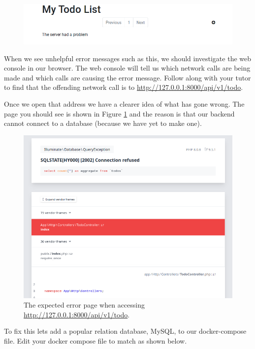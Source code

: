 \documentclass{csse4400}
\begin{document}
\begin{figure}[ht]
\includegraphics[width=\textwidth]{images/app-missing-db}
\end{figure}

When we see unhelpful error messages such as this,
we should investigate the web console in our browser.
The web console will tell us which network calls are being made and which calls are causing the error message.
Follow along with your tutor to find that the offending network call is to \url{http://127.0.0.1:8000/api/v1/todo}.

Once we open that address we have a clearer idea of what has gone wrong.
The page you should see is shown in Figure \ref{fig:expected-error} and the reason is that our backend cannot connect to a database (because we have yet to make one).

\begin{figure}[H]
\includegraphics[width=\textwidth]{images/missing-db}
\caption{The expected error page when accessing \url{http://127.0.0.1:8000/api/v1/todo}.}
\label{fig:expected-error}
\end{figure}

To fix this lets add a popular relation database, MySQL, to our docker-compose file.
Edit your docker compose file to match as shown below.
\end{document}
